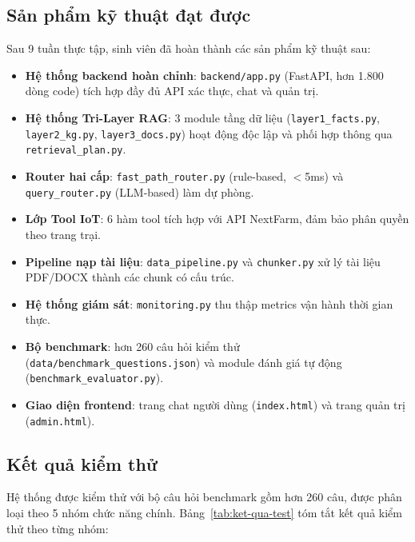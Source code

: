 \subsection{Sản phẩm kỹ thuật đạt được}

Sau 9 tuần thực tập, sinh viên đã hoàn thành các sản phẩm kỹ thuật sau:

\begin{itemize}
    \item \textbf{Hệ thống backend hoàn chỉnh}: \texttt{backend/app.py} (FastAPI, hơn 1.800 dòng code) tích hợp đầy đủ API xác thực, chat và quản trị.
    \item \textbf{Hệ thống Tri-Layer RAG}: 3 module tầng dữ liệu (\texttt{layer1\_facts.py}, \texttt{layer2\_kg.py}, \texttt{layer3\_docs.py}) hoạt động độc lập và phối hợp thông qua \texttt{retrieval\_plan.py}.
    \item \textbf{Router hai cấp}: \texttt{fast\_path\_router.py} (rule-based, $<$5ms) và \texttt{query\_router.py} (LLM-based) làm dự phòng.
    \item \textbf{Lớp Tool IoT}: 6 hàm tool tích hợp với API NextFarm, đảm bảo phân quyền theo trang trại.
    \item \textbf{Pipeline nạp tài liệu}: \texttt{data\_pipeline.py} và \texttt{chunker.py} xử lý tài liệu PDF/DOCX thành các chunk có cấu trúc.
    \item \textbf{Hệ thống giám sát}: \texttt{monitoring.py} thu thập metrics vận hành thời gian thực.
    \item \textbf{Bộ benchmark}: hơn 260 câu hỏi kiểm thử (\texttt{data/benchmark\_questions.json}) và module đánh giá tự động (\texttt{benchmark\_evaluator.py}).
    \item \textbf{Giao diện frontend}: trang chat người dùng (\texttt{index.html}) và trang quản trị (\texttt{admin.html}).
\end{itemize}

\subsection{Kết quả kiểm thử}

Hệ thống được kiểm thử với bộ câu hỏi benchmark gồm hơn 260 câu, được phân loại theo 5 nhóm chức năng chính. Bảng~\ref{tab:ket-qua-test} tóm tắt kết quả kiểm thử theo từng nhóm:

